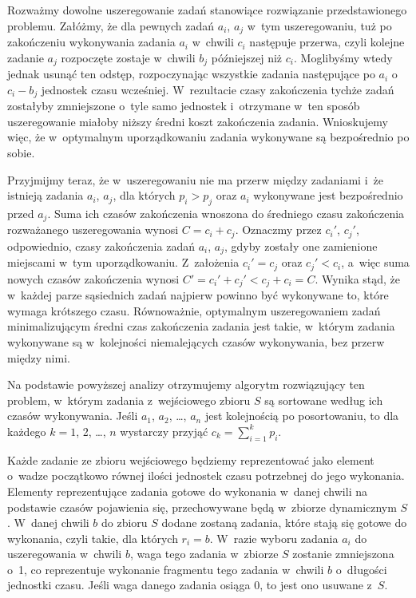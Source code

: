 
\subproblem %
Rozważmy dowolne uszeregowanie zadań stanowiące rozwiązanie przedstawionego problemu.
Załóżmy, że dla pewnych zadań $a_i$, $a_j$ w~tym uszeregowaniu, tuż po zakończeniu wykonywania zadania $a_i$ w~chwili $c_i$ następuje przerwa, czyli kolejne zadanie $a_j$ rozpoczęte zostaje w~chwili $b_j$ późniejszej niż $c_i$.
Moglibyśmy wtedy jednak usunąć ten odstęp, rozpoczynając wszystkie zadania następujące po $a_i$ o~$c_i-b_j$ jednostek czasu wcześniej.
W~rezultacie czasy zakończenia tychże zadań zostałyby zmniejszone o~tyle samo jednostek i~otrzymane w~ten sposób uszeregowanie miałoby niższy średni koszt zakończenia zadania.
Wnioskujemy więc, że w~optymalnym uporządkowaniu zadania wykonywane są bezpośrednio po sobie.

Przyjmijmy teraz, że w~uszeregowaniu nie ma przerw między zadaniami i~że istnieją zadania $a_i$, $a_j$, dla których $p_i>p_j$ oraz $a_i$ wykonywane jest bezpośrednio przed $a_j$.
Suma ich czasów zakończenia wnoszona do średniego czasu zakończenia rozważanego uszeregowania wynosi $C=c_i+c_j$.
Oznaczmy przez $c_i'$, $c_j'$, odpowiednio, czasy zakończenia zadań $a_i$, $a_j$, gdyby zostały one zamienione miejscami w~tym uporządkowaniu.
Z~założenia $c_i'=c_j$ oraz $c_j'<c_i$, a~więc suma nowych czasów zakończenia wynosi $C'=c_i'+c_j'<c_j+c_i=C$.
Wynika stąd, że w~każdej parze sąsiednich zadań najpierw powinno być wykonywane to, które wymaga krótszego czasu.
Równoważnie, optymalnym uszeregowaniem zadań minimalizującym średni czas zakończenia zadania jest takie, w~którym zadania wykonywane są w~kolejności niemalejących czasów wykonywania, bez przerw między nimi.

Na podstawie powyższej analizy otrzymujemy algorytm rozwiązujący ten problem, w~którym zadania z~wejściowego zbioru $S$ są sortowane według ich czasów wykonywania.
Jeśli $a_1$, $a_2$, \dots, $a_n$ jest kolejnością po posortowaniu, to dla każdego $k=1$, 2, \dots, $n$ wystarczy przyjąć $c_k=\sum_{i=1}^kp_i$.

\subproblem %
Każde zadanie ze zbioru wejściowego będziemy reprezentować jako element o~wadze początkowo równej ilości jednostek czasu potrzebnej do jego wykonania.
Elementy reprezentujące zadania gotowe do wykonania w~danej chwili na podstawie czasów pojawienia się, przechowywane będą w~zbiorze dynamicznym $S$.
W~danej chwili $b$ do zbioru $S$ dodane zostaną zadania, które stają się gotowe do wykonania, czyli takie, dla których $r_i=b$.
W~razie wyboru zadania $a_i$ do uszeregowania w~chwili $b$, waga tego zadania w~zbiorze $S$ zostanie zmniejszona o~1, co reprezentuje wykonanie fragmentu tego zadania w~chwili $b$ o~długości jednostki czasu.
Jeśli waga danego zadania osiąga 0, to jest ono usuwane z~$S$.

